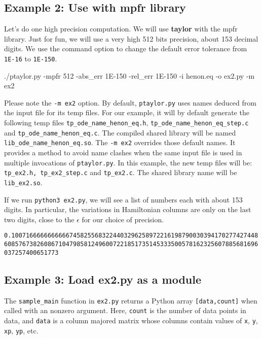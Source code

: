 \documentclass[10pt]{article}
\theoremstyle{remark}
\newcommand{\taylorname}{{\bf taylor}}
\begin{document}
\subsection{Example 2: Use with mpfr library}

Let's do one high precision computation. We will use \taylorname{}
with the mpfr library. Just for fun, we will use a very high 512 bits
precision, about 153 decimal digits. We use the command option to
change the default error tolerance from \verb+1E-16+ to \verb+1E-150+.
\begin{command}
./ptaylor.py -mpfr 512 -abs_err 1E-150 -rel_err 1E-150 -i henon.eq -o ex2.py -m ex2
\end{command}

\begin{mdframed}
Please note the \verb+-m ex2+ option. By default, \verb+ptaylor.py+
uses names deduced from the input file for its temp files. For our
example, it will by default generate the following temp files
\verb+tp_ode_name_henon_eq.h+, \verb+tp_ode_name_henon_eq_step.c+ and
\verb+tp_ode_name_henon_eq.c+. The compiled shared library will be
named \verb+lib_ode_name_henon_eq.so+. The \verb+-m ex2+ overrides
those default names. It provides a method to avoid name clashes when
the same input file is used in multiple invocations of
\verb+ptaylor.py+. In this example, the new temp files will be:
\verb+tp_ex2.h, tp_ex2_step.c+ and \verb+tp_ex2.c+. The shared library
name will be \verb+lib_ex2.so+.
\end{mdframed}


If we run \verb+python3 ex2.py+, we will see a list of numbers each
with about 153 digits. In particular, the variations in Hamiltonian
columns are only on the last two digits, close to the $\epsilon$ for
our choice of precision.

  \vspace{3mm}
  {\tiny{\verb+0.100716666666666674582556832244032962589722161987900303941702774274486085767382608671047985812496007221851735145333500578162325607885681696037257400651773+}}
  
\vspace{3mm}


\subsection{Example 3: Load ex2.py as a module}

 The \verb+sample_main+ function in \verb+ex2.py+ returns a Python
 array \verb+[data,count]+ when called with an nonzero
 argument. Here, \verb+count+ is the number of data points in data,
 and \verb+data+ is a column majored matrix whose columns contain
 values of \verb+x+, \verb+y+, \verb+xp+, \verb+yp+, etc. 
 
\end{document}
